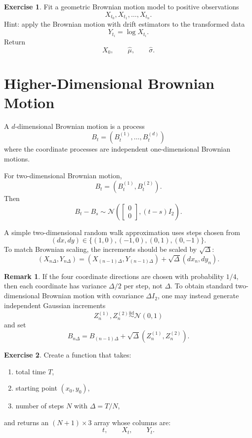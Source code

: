 \documentclass[12pt,oneside]{book}
\numberwithin{equation}{section}
\theoremstyle{definition}
\newtheorem{exercise}{Exercise}[section]
\newtheorem{remark}{Remark}[section]
\theoremstyle{plain}
\theoremstyle{remark}
\newcommand{\iid}{\overset{\text{iid}}{\sim}}
\newcommand{\Normal}{\mathcal{N}}
\begin{document}
\begin{exercise}
Fit a geometric Brownian motion model to positive observations
\[
X_{t_0},X_{t_1},\ldots,X_{t_n}.
\]
Hint: apply the Brownian motion with drift estimators to the transformed data
\[
Y_{t_i}=\log X_{t_i}.
\]
Return
\[
X_0,\qquad \hat{\mu},\qquad \hat{\sigma}.
\]
\end{exercise}

\section{Higher-Dimensional Brownian Motion}

A $d$-dimensional Brownian motion is a process
\[
B_t=(B_t^{(1)},\ldots,B_t^{(d)})
\]
where the coordinate processes are independent one-dimensional Brownian motions.

For two-dimensional Brownian motion,
\[
B_t=(B_t^{(1)},B_t^{(2)}).
\]
Then
\[
B_t-B_s
\sim
\Normal\left(
\begin{bmatrix}
0\\
0
\end{bmatrix},
(t-s)I_2
\right).
\]

A simple two-dimensional random walk approximation uses steps chosen from
\[
(dx,dy)\in\{(1,0),(-1,0),(0,1),(0,-1)\}.
\]
To match Brownian scaling, the increments should be scaled by $\sqrt{\Delta}$:
\[
(X_{n\Delta},Y_{n\Delta})
=
(X_{(n-1)\Delta},Y_{(n-1)\Delta})
+
\sqrt{\Delta}(dx_n,dy_n).
\]

\begin{remark}
If the four coordinate directions are chosen with probability $1/4$, then each coordinate has variance $\Delta/2$ per step, not $\Delta$. To obtain standard two-dimensional Brownian motion with covariance $\Delta I_2$, one may instead generate independent Gaussian increments
\[
Z_n^{(1)},Z_n^{(2)}\iid \Normal(0,1)
\]
and set
\[
B_{n\Delta}=B_{(n-1)\Delta}+\sqrt{\Delta}(Z_n^{(1)},Z_n^{(2)}).
\]
\end{remark}

\begin{exercise}
Create a function that takes:
\begin{enumerate}
\item total time $T$,
\item starting point $(x_0,y_0)$,
\item number of steps $N$ with $\Delta=T/N$,
\end{enumerate}
and returns an $(N+1)\times 3$ array whose columns are:
\[
t,\qquad X_t,\qquad Y_t.
\]
\end{exercise}
\end{document}
